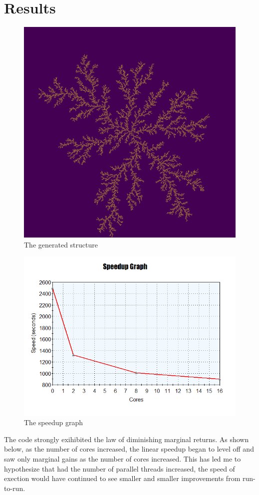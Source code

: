 \documentclass[11pt]{article}
\begin{document}
\section{Results}
\begin{figure}[h!]
  \includegraphics[width=\linewidth]{output.png}
  \caption{The generated structure}
\end{figure}
\begin{figure}[h!]
  \includegraphics[width=\linewidth]{speedup.png}
  \caption{The speedup graph}
\end{figure}
The code strongly exihibited the law of diminishing marginal returns. As shown below, as the number of cores increased, the linear speedup began to level off and saw only marginal gains as the number of cores increased. This has led me to hypothesize that had the number of parallel threads increased, the speed of exection would have continued to see smaller and smaller improvements from run-to-run.
\end{document}
